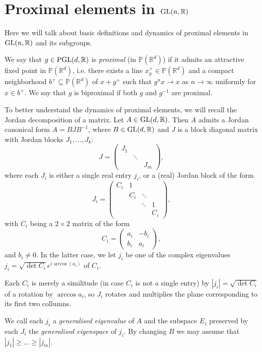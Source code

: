 \documentclass{report}
\begin{document}
\section{Proximal elements in $\operatorname{{\mathrm{GL}}}(n,\mathbb{R})$}
Here we will talk about basic definitions and dynamics of proximal elements in $\operatorname{{\mathrm{GL}}}(n,\mathbb{R})$ and its subgroups.
\begin{definition}
    We say that $g \in \operatorname{{\mathrm{PGL}}}(d, \mathbb R)$ is \emph{proximal} (in $\mathbb P(\mathbb R^d)$) if it admits an attractive fixed point in $\mathbb P(\mathbb R^d)$, i.e. there exists a line $x_g^+ \in \mathbb P(\mathbb R^d)$ and a compact neighborhood $b^+ \subseteq \mathbb P(\mathbb R^d)$ of $x+g^+$ such that $g^n x \to x $ as $n \to \infty$ uniformly for $x \in b^+$.
    We say that $g$ is biproximal if both $g$ and $g^{-1}$ are proximal.
\end{definition}

To better understand the dynamics of proximal elements, we will recall the Jordan decomposition of a matrix.
Let $A \in \operatorname{{\mathrm{GL}}}(d,\mathbb R)$.
Then $A$ admits a Jordan canonical form $A = B J B^{-1}$, where $B \in \operatorname{{\mathrm{GL}}}(d, \mathbb R)$ and $J$ is a block diagonal matrix with Jordan blocks $J_1, \ldots, J_k$:
\[
J = \begin{pmatrix}
    J_1 & & \\
    & \ddots & \\
    & & J_m
\end{pmatrix},
\]
where each $J_i$ is either a single real entry $j_i$, or a (real) Jordan block of the form
\[
J_i = \begin{pmatrix}
    C_i & 1 & & \\
    & C_i & \ddots & \\
    & & \ddots & 1 \\
    & & & C_i
\end{pmatrix},
\]
with $C_i$ being a $2 \times 2$ matrix of the form
\[
C_i = \begin{pmatrix}
    a_i & -b_i \\
    b_i & a_i
\end{pmatrix},
\]
and $b_i \neq 0$.
In the latter case, we let $j_i$ be one of the complex eigenvalues $j_i = \sqrt{\det C_i} e^{i \arccos(a_i)}$ of $C_i$.
\begin{remark}
    Each $C_i$ is merely a similitude (in case $C_i$ is not a single entry) by $|j_i| = \sqrt{\det C_i}$ of a rotation by $\arccos a_i$, so $J_i$ rotates and multiplies the plane corresponding to its first two collumns.
\end{remark}
We call each $j_i$ a \emph{generalised eigenvalue} of $A$ and the subspace $E_i$ preserved by each $J_i$ the \emph{generalised eigenspace} of $j_i$.
By changing $B$ we may assume that $|j_1| \geq \ldots \geq |j_m|$.
\end{document}
